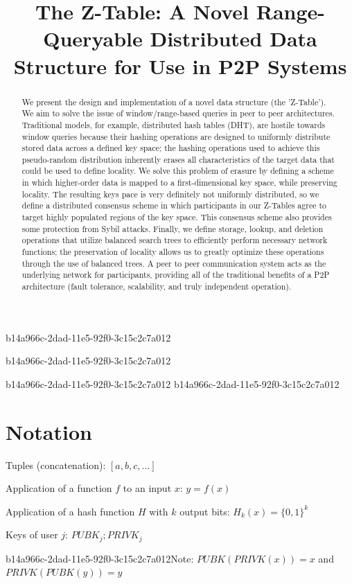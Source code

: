 \documentclass[12pt]{article}
\title{The Z-Table: A Novel Range-Queryable Distributed Data Structure for Use in P2P Systems}
\begin{document}
b14a966c-2dad-11e5-92f0-3c15c2c7a012\maketitle

b14a966c-2dad-11e5-92f0-3c15c2c7a012\begin{abstract}
We present the design and implementation of a novel data structure (the 'Z-Table'). We aim to solve the issue of window/range-based queries in peer to peer architectures. Traditional models, for example,  distributed hash tables (DHT), are hostile towards window queries because their hashing operations are designed to uniformly distribute stored data across a defined key space; the hashing operations used to achieve this pseudo-random distribution inherently erases all characteristics of the target data that could be used to define locality. We solve this problem of erasure by defining a scheme in which higher-order data is mapped to a first-dimensional key space, while preserving locality. The resulting keys pace is very definitely not uniformly distributed, so we define a distributed consensus scheme in which participants in our Z-Tables agree to target highly populated regions of the key space. This consensus scheme also provides some protection from Sybil attacks. Finally, we define storage, lookup, and deletion operations that utilize balanced search trees to efficiently perform necessary network functions; the preservation of locality allows us to greatly optimize these operations through the use of balanced trees. A peer to peer communication system acts as the underlying network for participants, providing all of the traditional benefits of a P2P architecture (fault tolerance, scalability, and truly independent operation).
\end{abstract}
b14a966c-2dad-11e5-92f0-3c15c2c7a012
b14a966c-2dad-11e5-92f0-3c15c2c7a012\section{Notation}

Tuples (concatenation): $[a,b,c,...]$

Application of a function $f$ to an input $x$: $y=f(x)$

Application of a hash function $H$ with $k$ output bits: $H_{k}(x) = \{0,1\}^k$

Keys of user $j$: $ PUBK_j; PRIVK_j $

b14a966c-2dad-11e5-92f0-3c15c2c7a012Note: $PUBK(PRIVK(x)) = x$ and $PRIVK(PUBK(y)) = y$~
\end{document}
